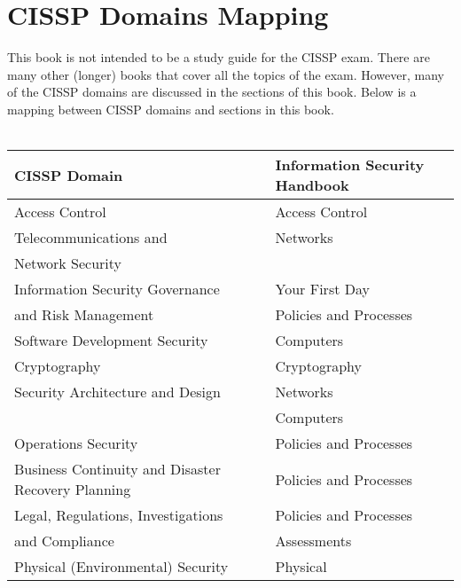 \section{CISSP Domains Mapping}
This book is not intended to be a study guide for the CISSP exam. There are many other (longer) books that cover all the topics of the exam. However, many of the CISSP domains are discussed in the sections of this book. Below is a mapping between CISSP domains and sections in this book.\\\\
\begin{tabularx}{\textwidth}{ X | X }
CISSP Domain & Information Security Handbook\\
\hline
Access Control & Access Control\\
\hline
Telecommunications and  & Networks \\Network Security &\\
\hline
Information Security Governance & Your First Day \\ and Risk Management & Policies and Processes \\
\hline
Software Development Security & Computers\\
\hline
Cryptography & Cryptography\\
\hline
Security Architecture and Design & Networks\\ & Computers\\
\hline
Operations Security & Policies and Processes\\
\hline
Business Continuity and Disaster Recovery Planning & Policies and Processes\\
\hline
Legal, Regulations, Investigations & Policies and Processes \\ and Compliance & Assessments\\
\hline
Physical (Environmental) Security & Physical\\
\end{tabularx}